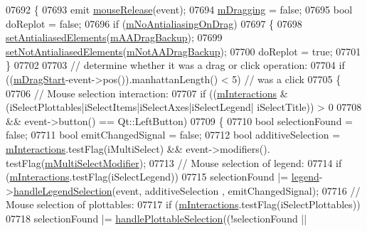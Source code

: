 \begin{DoxyCode}
07692 \{
07693   emit \hyperlink{a00116_ac8dc0ee6bb98e923c00b4ebafbe6134d}{mouseRelease}(event);
07694   \hyperlink{a00116_ad1273fad7e12b0f61819343368778928}{mDragging} = \textcolor{keyword}{false};
07695   \textcolor{keywordtype}{bool} doReplot = \textcolor{keyword}{false};
07696   \textcolor{keywordflow}{if} (\hyperlink{a00116_abfc5e49800e5ca84fa6312b9bb814b3b}{mNoAntialiasingOnDrag})
07697   \{
07698     \hyperlink{a00116_af6f91e5eab1be85f67c556e98c3745e8}{setAntialiasedElements}(\hyperlink{a00116_ac6e9f4d75a28eb37ee454e1907655e8b}{mAADragBackup});
07699     \hyperlink{a00116_ae10d685b5eabea2999fb8775ca173c24}{setNotAntialiasedElements}(\hyperlink{a00116_aac79a49a340f3e5b06465bb730431013}{mNotAADragBackup});
07700     doReplot = \textcolor{keyword}{true};
07701   \}
07702   
07703   \textcolor{comment}{// determine whether it was a drag or click operation:}
07704   \textcolor{keywordflow}{if} ((\hyperlink{a00116_a23a3ce3b031eef6349252229446f3665}{mDragStart}-event->pos()).manhattanLength() < 5) \textcolor{comment}{// was a click}
07705   \{
07706     \textcolor{comment}{// Mouse selection interaction:}
07707     \textcolor{keywordflow}{if} ((\hyperlink{a00116_af8d040767753acc548b2368dd4150ae6}{mInteractions} & (iSelectPlottables|iSelectItems|iSelectAxes|iSelectLegend|
      iSelectTitle)) > 0 
07708         && event->button() == Qt::LeftButton)
07709     \{
07710       \textcolor{keywordtype}{bool} selectionFound = \textcolor{keyword}{false};
07711       \textcolor{keywordtype}{bool} emitChangedSignal = \textcolor{keyword}{false};
07712       \textcolor{keywordtype}{bool} additiveSelection = \hyperlink{a00116_af8d040767753acc548b2368dd4150ae6}{mInteractions}.testFlag(iMultiSelect) && \textcolor{keyword}{event}->modifiers().
      testFlag(\hyperlink{a00116_a690dbabf892af5969b09e9f69bb83a9b}{mMultiSelectModifier});
07713       \textcolor{comment}{// Mouse selection of legend:}
07714       \textcolor{keywordflow}{if} (\hyperlink{a00116_af8d040767753acc548b2368dd4150ae6}{mInteractions}.testFlag(iSelectLegend))
07715         selectionFound |= \hyperlink{a00116_a75acd427ec48e9a9d2ae6a17817cc490}{legend}->\hyperlink{a00045_a44cdc6af6cd6e62a2bd827c3236c7261}{handleLegendSelection}(event, additiveSelection
      , emitChangedSignal);
07716       \textcolor{comment}{// Mouse selection of plottables:}
07717       \textcolor{keywordflow}{if} (\hyperlink{a00116_af8d040767753acc548b2368dd4150ae6}{mInteractions}.testFlag(iSelectPlottables))
07718         selectionFound |= \hyperlink{a00116_a881c8652ebb912345de27687817845cf}{handlePlottableSelection}((!selectionFound || 

\end{DoxyCode}
